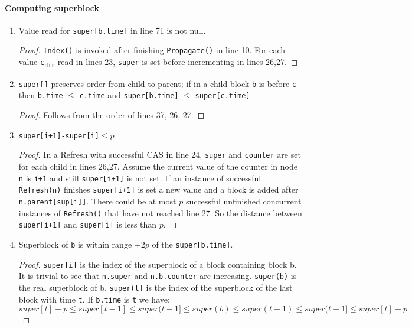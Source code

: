 \documentclass[10pt]{article}
\theoremstyle{definition}
\begin{document}
\paragraph{Computing superblock}
\begin{enumerate}
  \item Value read for \texttt{super[b.time]} in line 71 is not null.\begin{proof}
    \texttt{Index()} is invoked after finishing \texttt{Propagate()} in line 10. For each value \texttt{c\textsubscript{dir}} read in lines 23, \texttt{super} is set before incrementing in lines 26,27.
  \end{proof} 
  \item \texttt{super[]} preserves order from child to parent; if in a child block \texttt{b} is before \texttt{c} then \texttt{b.time} $\leq$ \texttt{c.time} and \texttt{super[b.time]} $\leq$ \texttt{super[c.time]}\begin{proof}
   Follows from the order of lines 37, 26, 27.
 \end{proof}
  \item \texttt{super[i+1]-super[i]}$\leq p$
\begin{proof}
 In a Refresh with successful CAS in line 24, \texttt{super} and \texttt{counter} are set for each child in lines 26,27. Assume the current value of the counter in node \texttt{n} is \texttt{i+1} and still \texttt{super[i+1]} is not set. If an instance of successful \texttt{Refresh(n)} finishes \texttt{super[i+1]} is set a new value and a block is added after \texttt{n.parent[sup[i]]}. There could be at most $p$ successful unfinished concurrent instances of \texttt{Refresh()} that have not reached line 27. So the distance between \texttt{super[i+1]} and \texttt{super[i]} is less than $p$.
 \end{proof}
  \item Superblock of \texttt{b} is within range $\pm 2p$ of the \texttt{super[b.time]}.
\begin{proof}
\texttt{super[i]} is the index of the superblock of a block containing block b. It is trivial to see that \texttt{n.super} and \texttt{n.b.counter} are increasing.  \texttt{super(b)} is the real superblock of b. \texttt{super(t]} is the index of the superblock of the last block with time \texttt{t}. If \texttt{b.time} is \texttt{t} we have:
$$super[t]-p\leq super[t-1]\leq super(t-1] \leq super(b) \leq super(t+1)\leq super(t+1]\leq super[t]+p$$
  \end{proof} 
\end{enumerate}
\end{document}
